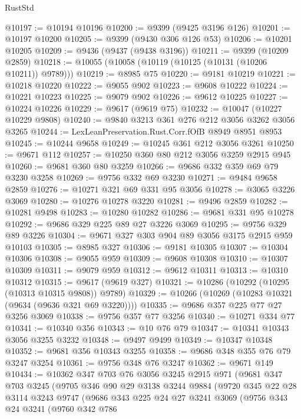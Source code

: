 \begin{lexlean}{RustStd}
\begin{coremodule}
@10197 := @10194 @10196
@10200 := @9399 (@9425 @3196 @126)
@10201 := @10197 @10200
@10205 := @9399 (@9430 @306 @126 @53)
@10206 := @10201 @10205
@10209 := @9436 (@9437 (@9438 @3196))
@10211 := @9399 (@10209 @2859)
@10218 := @10055 (@10058 (@10119 (@10125 (@10131 (@10206 @10211)) @9789)))
@10219 := @8985 @75
@10220 := @9181 @10219
@10221 := @10218 @10220
@10222 := @9055 @902
@10223 := @9608 @10222
@10224 := @10221 @10223
@10225 := @9079 @902
@10226 := @9612 @10225
@10227 := @10224 @10226
@10229 := @9617 (@9619 @75)
@10232 := @10047 (@10227 @10229 @9808)
@10240 := @9840 @3213 @361 @276 @212 @3056 @3262 @3056 @3265
@10244 := LexLeanPreservation.Rust.Corr.fOfB @8949 @8951 @8953
@10245 := @10244 @9658
@10249 := @10245 @361 @212 @3056 @3261
@10250 := @9671 @112
@10257 := @10250 @360 @80 @212 @3056 @3259 @2915 @945
@10260 := @9681 @360 @80 @3259
@10266 := @9686 @332 @359 @69 @79 @3230 @3258
@10269 := @9756 @332 @69 @3230
@10271 := @9484 @9658 @2859
@10276 := @10271 @321 @69 @331 @95 @3056
@10278 := @3065 @3226 @3069
@10280 := @10276 @10278 @3220
@10281 := @9496 @2859
@10282 := @10281 @9498
@10283 := @10280 @10282
@10286 := @9681 @331 @95 @10278
@10292 := @9686 @329 @225 @89 @27 @3226 @3069
@10295 := @9756 @329 @89 @3226
@10304 := @9671 @327 @303 @904 @89 @3056 @3175 @2915 @959 @10103
@10305 := @8985 @327
@10306 := @9181 @10305
@10307 := @10304 @10306
@10308 := @9055 @959
@10309 := @9608 @10308
@10310 := @10307 @10309
@10311 := @9079 @959
@10312 := @9612 @10311
@10313 := @10310 @10312
@10315 := @9617 (@9619 @327)
@10321 := @10286 (@10292 (@10295 (@10313 @10315 @9808)) @9789)
@10329 := @10266 (@10269 (@10283 @10321 (@9634 (@9636 @321 @69 @3220))))
@10335 := @9686 @357 @225 @77 @27 @3256 @3069
@10338 := @9756 @357 @77 @3256
@10340 := @10271 @334 @77
@10341 := @10340 @356
@10343 := @10 @76 @79
@10347 := @10341 @10343 @3056 @3255 @3232
@10348 := @9497 @9499
@10349 := @10347 @10348
@10352 := @9681 @356 @10343 @3255
@10358 := @9686 @348 @355 @76 @79 @3247 @3254
@10361 := @9756 @348 @76 @3247
@10362 := @9671 @149
@10434 := @10362
    @347
    @703
    @76
    @3056
    @3245
    @2915
    @971
    (@9681
      @347
      @703
      @3245
      (@9705
        @346
        @90
        @29
        @3138
        @3244
        @9884
        (@9720
          @345
          @22
          @28
          @3114
          @3243
          @9747
          (@9686
            @343
            @225
            @24
            @27
            @3241
            @3069
            (@9756
              @343
              @24
              @3241
              (@9760
                @342
                @786

\end{coremodule}
\end{lexlean}
